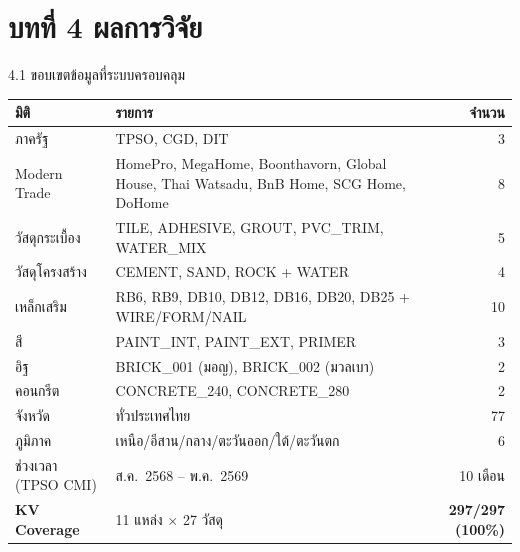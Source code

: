 \documentclass[aspectratio=169,11pt]{beamer}
\begin{document}
\section{บทที่ 4 ผลการวิจัย}

\begin{frame}{4.1 ขอบเขตข้อมูลที่ระบบครอบคลุม}
  \scriptsize
  \begin{table}
    \centering
    \begin{tabularx}{\textwidth}{l X r}
      \toprule
      \textbf{มิติ} & \textbf{รายการ} & \textbf{จำนวน} \\
      \midrule
      ภาครัฐ              & TPSO, CGD, DIT                                            & 3 \\
      Modern Trade        & HomePro, MegaHome, Boonthavorn, Global House,
                            Thai Watsadu, BnB Home, SCG Home, DoHome                  & 8 \\
      วัสดุกระเบื้อง       & TILE, ADHESIVE, GROUT, PVC\_TRIM, WATER\_MIX               & 5 \\
      วัสดุโครงสร้าง       & CEMENT, SAND, ROCK + WATER                                & 4 \\
      เหล็กเสริม          & RB6, RB9, DB10, DB12, DB16, DB20, DB25 + WIRE/FORM/NAIL    & 10 \\
      สี                   & PAINT\_INT, PAINT\_EXT, PRIMER                            & 3 \\
      อิฐ                  & BRICK\_001 (มอญ), BRICK\_002 (มวลเบา)                     & 2 \\
      คอนกรีต              & CONCRETE\_240, CONCRETE\_280                              & 2 \\
      จังหวัด              & ทั่วประเทศไทย                                              & 77 \\
      ภูมิภาค              & เหนือ/อีสาน/กลาง/ตะวันออก/ใต้/ตะวันตก                     & 6 \\
      ช่วงเวลา (TPSO CMI)  & ส.ค.~2568 -- พ.ค.~2569                                  & 10 เดือน \\
      \midrule
      \textbf{KV Coverage} & 11 แหล่ง $\times$ 27 วัสดุ                                & \textbf{297/297 (100\%)} \\
      \bottomrule
    \end{tabularx}
  \end{table}
\end{frame}
\end{document}
